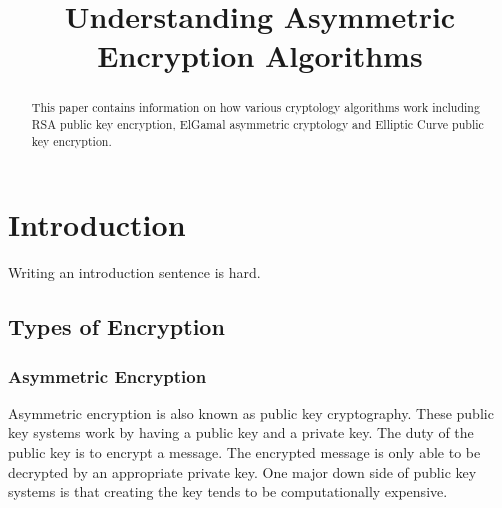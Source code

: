 \documentclass[conference]{IEEEtran}
\begin{document}
	
\title{Understanding Asymmetric Encryption Algorithms}


\author{
\and
{}
}

\maketitle

\begin{abstract}
	This paper contains information on how various cryptology algorithms work including RSA public key encryption, ElGamal asymmetric cryptology and Elliptic Curve public key encryption. 
\end{abstract}

\IEEEpeerreviewmaketitle



\section{Introduction} \color{red}
Writing an introduction sentence is hard. 

\color{black}
\subsection{Types of Encryption}


\subsubsection{Asymmetric Encryption}
Asymmetric encryption is also known as public key cryptography. These public key systems work by having a public key and a private key. The duty of the public key is to encrypt a message. The encrypted message is only able to be decrypted by an appropriate private key. One major down side of public key systems is that creating the key tends to be computationally expensive. 
\end{document}

